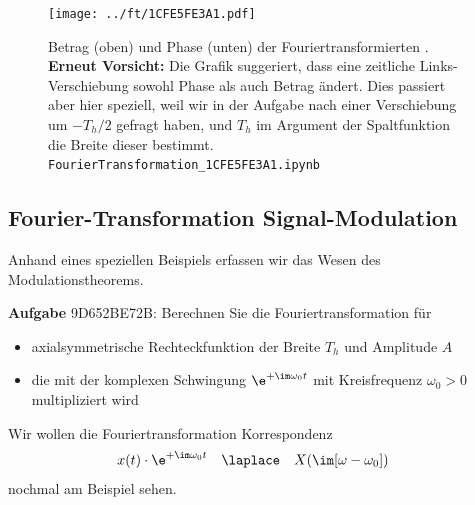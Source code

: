 %
\begin{figure}[h!]
\texttt{[image: ../ft/1CFE5FE3A1.pdf]}
  \caption{Betrag (oben) und Phase (unten) der Fouriertransformierten .
\textbf{Erneut Vorsicht:} Die Grafik suggeriert, dass eine zeitliche Links-Verschiebung
sowohl Phase als auch Betrag ändert. Dies passiert aber hier speziell, weil wir in der
Aufgabe nach einer Verschiebung um $-T_h/2$ gefragt haben, und $T_h$
im Argument der Spaltfunktion die Breite dieser bestimmt.
\texttt{FourierTransformation\_1CFE5FE3A1.ipynb}}
  \label{fig:1CFE5FE3A1}
\end{figure}





\clearpage
\subsection{Fourier-Transformation Signal-Modulation}
\label{sec:9D652BE72B}
\begin{Ziel}
Anhand eines speziellen Beispiels erfassen wir das Wesen des Modulationstheorems.
\end{Ziel}
\textbf{Aufgabe} {\tiny 9D652BE72B}: Berechnen Sie die Fouriertransformation für
\begin{itemize}
\item axialsymmetrische Rechteckfunktion der Breite $T_h$ und Amplitude $A$
\item die mit der komplexen Schwingung $\e^{+\im \omega_0 t}$ mit Kreisfrequenz $\omega_0>0$
multipliziert wird
\end{itemize}
Wir wollen die Fouriertransformation Korrespondenz 
\begin{align}
x(t) \cdot \e^{+\im\omega_0 t} & \quad \laplace \quad X(\im[\omega-\omega_0])
\end{align}
nochmal am Beispiel sehen.

\begin{figure}[h!]
\centering
{}
\end{figure}

